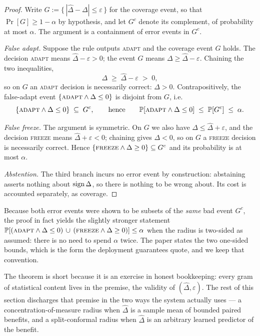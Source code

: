 \begin{proof}
Write $G:=\{\,|\widehat\Delta-\Delta|\le\varepsilon\,\}$ for the coverage event, so
that $\Pr[G]\ge 1-\alpha$ by hypothesis, and let $G^c$ denote its complement, of
probability at most $\alpha$. The argument is a containment of error events in $G^c$.

\emph{False adapt.} Suppose the rule outputs \textsc{adapt} and the coverage event $G$
holds. The decision \textsc{adapt} means $\widehat\Delta-\varepsilon>0$; the event $G$
means $\Delta\ge\widehat\Delta-\varepsilon$. Chaining the two inequalities,
\[
\Delta\;\ge\;\widehat\Delta-\varepsilon\;>\;0 ,
\]
so on $G$ an \textsc{adapt} decision is necessarily correct: $\Delta>0$. Contrapositively,
the false-adapt event $\{\textsc{adapt}\wedge\Delta\le0\}$ is disjoint from $G$, i.e.
\[
\{\textsc{adapt}\wedge\Delta\le0\}\;\subseteq\;G^c ,
\qquad\text{hence}\qquad
\Pr[\textsc{adapt}\wedge\Delta\le0]\;\le\;\Pr[G^c]\;\le\;\alpha .
\]

\emph{False freeze.} The argument is symmetric. On $G$ we also have
$\Delta\le\widehat\Delta+\varepsilon$, and the decision \textsc{freeze} means
$\widehat\Delta+\varepsilon<0$; chaining gives $\Delta<0$, so on $G$ a \textsc{freeze}
decision is necessarily correct. Hence
$\{\textsc{freeze}\wedge\Delta\ge0\}\subseteq G^c$ and its probability is at most
$\alpha$.

\emph{Abstention.} The third branch incurs no error event by construction: abstaining
asserts nothing about $\sign\Delta$, so there is nothing to be wrong about. Its cost is
accounted separately, as coverage. \qedhere
\end{proof}

\begin{remark}
\label{sec:t2-rem-union}
Because both error events were shown to be subsets of the \emph{same} bad event $G^c$,
the proof in fact yields the slightly stronger statement
$\Pr[(\textsc{adapt}\wedge\Delta\le0)\,\cup\,(\textsc{freeze}\wedge\Delta\ge0)]\le\alpha$
when the radius is two-sided as assumed: there is no need to spend $\alpha$ twice. The
paper states the two one-sided bounds, which is the form the deployment guarantees
quote, and we keep that convention.
\end{remark}

The theorem is short because it is an exercise in honest bookkeeping: every gram of
statistical content lives in the premise, the validity of $(\widehat\Delta,\varepsilon)$.
The rest of this section discharges that premise in the two ways the system actually
uses --- a concentration-of-measure radius when $\widehat\Delta$ is a sample mean of
bounded paired benefits, and a split-conformal radius when $\widehat\Delta$ is an
arbitrary learned predictor of the benefit.

